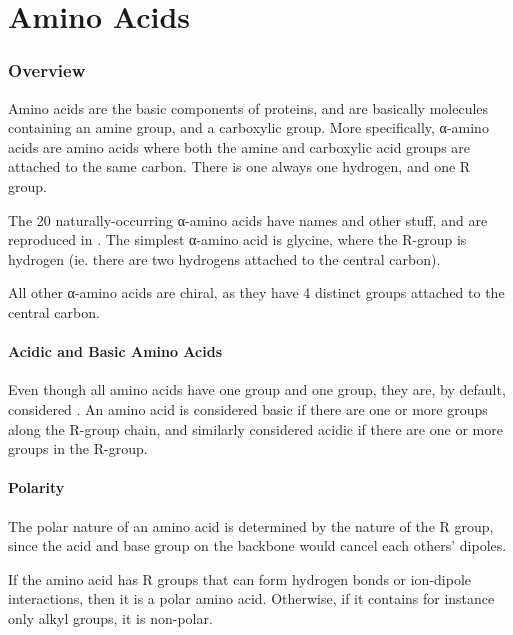 
\pagebreak
\hypertarget{ChapterAminoAcids}{}
\part{Amino Acids}

	\section{Overview}

		Amino acids are the basic components of proteins, and are basically molecules containing  an amine group, and a carboxylic
		group. More specifically, α-amino acids are amino acids where both the amine and carboxylic acid groups are attached to the same carbon.
		There is one always one hydrogen, and one R group.

		The 20 naturally-occurring α-amino acids have names and other stuff, and are reproduced in
		\hyperlink{AppendixListOfAminoAcids}{}. The simplest α-amino acid is glycine, where the R-group is hydrogen (ie.
		there are two hydrogens attached to the central carbon).

		All other α-amino acids are chiral, as they have 4 distinct groups attached to the central carbon.

		\subsection{Acidic and Basic Amino Acids}

			Even though all amino acids have one  group and one  group, they are, by default, considered . An
			amino acid is considered basic if there are one or more  groups along the R-group chain, and similarly considered
			acidic if there are one or more  groups in the R-group.


		\subsection{Polarity}

			The polar nature of an amino acid is determined by the nature of the R group, since the acid and base group on the backbone would
			cancel each others' dipoles.

			If the amino acid has R groups that can form hydrogen bonds or ion-dipole interactions, then it is a polar amino acid. Otherwise,
			if it contains for instance only alkyl groups, it is non-polar.

